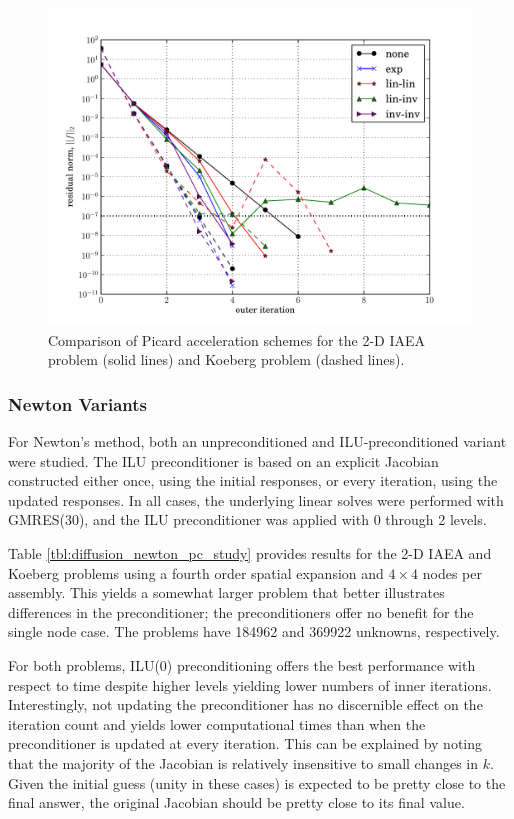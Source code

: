 \begin{figure}[ht]
    \centering
    \includegraphics[keepaspectratio, width = 5.0 in]
                    {diffusion_picard_acceleration}
    \caption{Comparison of Picard acceleration schemes for the 
             2-D IAEA problem (solid lines) and Koeberg 
             problem (dashed lines).  }
    \label{fig:diffusion_picard_acceleration}
\end{figure}

\subsubsection{Newton Variants}

For Newton's method, both an unpreconditioned 
and ILU-preconditioned variant were studied.  The ILU preconditioner 
is based on an explicit Jacobian constructed either once, using the 
initial responses, or every iteration, using the updated responses.  
In all cases, the underlying linear solves were performed with GMRES(30),
and the ILU preconditioner was applied with 0 through 2 levels.

Table \ref{tbl:diffusion_newton_pc_study} provides results for the 
2-D IAEA and Koeberg problems using a fourth order spatial 
expansion and $4\times 4$ nodes per assembly.  This yields a 
somewhat larger problem that better illustrates differences 
in the preconditioner; the preconditioners offer no benefit 
for the single node case.  The problems have 184962 and 
369922 unknowns, respectively.

For both problems, ILU(0) preconditioning offers the best performance
with respect to time despite higher levels yielding lower numbers of 
inner iterations.
Interestingly, not updating the preconditioner has no discernible effect 
on the iteration count and yields lower computational times than when 
the preconditioner is updated at every iteration.  This can be explained 
by noting that the majority of the Jacobian is relatively insensitive 
to small changes in $k$.  Given the initial guess (unity in these cases)
is expected to be pretty close to the final answer, the original Jacobian
should be pretty close to its final value.


